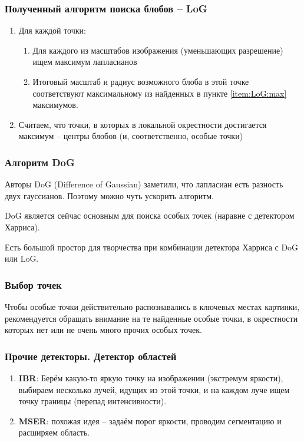 \documentclass[main.tex]{subfiles}
\begin{document}
\subsubsection{Полученный алгоритм поиска блобов -- LoG}
\begin{enumerate}
	\item Для каждой точки:
	\begin{enumerate}[noitemsep]
		\item Для каждого из масштабов изображения (уменьшающих разрешение) ищем максимум лапласианов \label{item:LoG:max}
		\item Итоговый масштаб и радиус возможного блоба в этой точке соответствуют максимальному из найденных в пункте \ref{item:LoG:max} максимумов.
	\end{enumerate}
	\item Считаем, что точки, в которых в локальной окрестности достигается максимум -- центры блобов (и, соответственно, особые точки)
\end{enumerate}

\subsubsection{Алгоритм DoG}

Авторы DoG (Difference of Gaussian) заметили, что лапласиан есть разность двух гауссианов.
Поэтому можно чуть ускорить алгоритм.

DoG является сейчас основным для поиска особых точек (наравне с детектором Харриса).

Есть большой простор для творчества при комбинации детектора Харриса с DoG или LoG.

\subsubsection{Выбор точек}

Чтобы особые точки действительно распознавались в ключевых местах картинки, рекомендуется обращать внимание на те найденные особые точки, в окрестности которых нет или не очень много прочих особых точек.

\subsubsection{Прочие детекторы. Детектор областей}
\begin{enumerate}
	\item \textbf{IBR}: Берём какую-то яркую точку на изображении (экстремум яркости), выбираем несколько лучей, идущих из этой точки, и на каждом луче ищем точку границы (перепад интенсивности).
	\item \textbf{MSER}: похожая идея -- задаём порог яркости, проводим сегментацию и расширяем область.
\end{enumerate}
\end{document}
